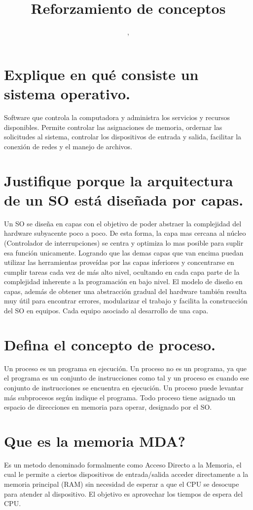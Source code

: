 \documentclass{article}
\author{\nombre , \carnet}
\title{\textbf{\Huge\titulo}\\Reforzamiento de conceptos}
\begin{document}
\maketitle
\section{Explique en qué consiste un sistema operativo.}
Software que controla la computadora y administra los servicios y recursos disponibles. Permite controlar las asignaciones de memoria, ordernar las solicitudes al sistema, controlar los dispositivos de entrada y salida, facilitar la conexión de redes y el manejo de archivos. 

\section{Justifique porque la arquitectura de un SO está diseñada por capas.}
Un SO se diseña en capas con el objetivo de poder abstraer la complejidad del hardware subyacente poco a poco. De esta forma, la capa mas cercana al núcleo (Controlador de interrupciones) se centra y optimiza lo mas posible para suplir esa función unicamente. Logrando que las demas capas que van encima puedan utilizar las herramientas proveídas por las capas inferiores y concentrarse en cumplir tareas cada vez de más alto nivel, ocultando en cada capa parte de la complejidad inherente a la programación en bajo nivel. El modelo de diseño en capas, además de obtener una abstracción gradual del hardware también resulta muy útil para encontrar errores, modularizar el trabajo y facilita la construcción del SO en equipos. Cada equipo asociado al desarrollo de una capa. 

\section{Defina el concepto de proceso.}
Un proceso es un programa en ejecución. Un proceso no es un programa, ya que 
el programa es un conjunto de instrucciones como tal y un proceso es cuando 
ese conjunto de instrucciones se encuentra en ejecución.
Un proceso puede levantar más subprocesos según indique el programa.
Todo proceso tiene asignado un espacio de direcciones en memoria para operar, designado por el SO.

\section{Que es la memoria MDA?}
Es un metodo denominado formalmente como Acceso Directo a la Memoria, el cual le permite a ciertos dispositivos de entrada/salida acceder directamente a la memoria principal (RAM) sin necesidad de esperar a que el CPU se desocupe para atender al dispositivo. El objetivo es aprovechar los tiempos de espera del CPU.
\end{document}
